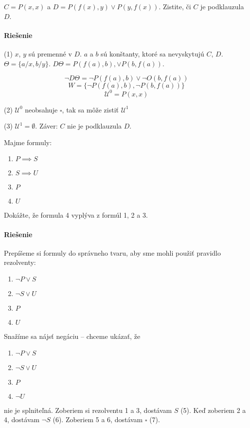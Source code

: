 \begin{priklad}
    $C=P(x,x)$ a $D=P(f(x),y) \lor P(y,f(x))$. Zistite, či $C$
    je podklauzula $D$.

    \paragraph{Riešenie} (1) $x$, $y$ sú premenné v $D$. $a$ a $b$ sú konštanty,
    ktoré sa nevyskytujú $C$, $D$. $\Theta = \{ a/x, b/y\}$. $D\Theta = P(f(a),b), \lor P(b,
    f(a))$.

    $$\neg D\Theta = \neg P(f(a),b) \lor \neg O(b,f(a))$$
    $$W = \{ \neg P(f(a),b), \neg P(b,f(a))\}$$
    $$\mathcal{U}^0 = P(x,x)$$


    \par (2) $\mathcal{U}^0$ neobsahuje $\square$, tak sa môže zistiť
    $\mathcal{U}^1$
    \par (3) $\mathcal{U}^1 = \emptyset$. Záver: $C$ nie je podklauzula $D$.
\end{priklad}

\begin{priklad}
    Majme formuly:

    \begin{enumerate}
        \item $P\implies S$
        \item $S \implies U$
        \item $P$
        \item $U$
    \end{enumerate}

    Dokážte, že formula 4 vyplýva z formúl 1, 2 a 3. 

    \paragraph{Riešenie} Prepíšeme si formuly do správneho tvaru, aby sme mohli
    použiť pravidlo rezolventy:
    \begin{enumerate}
            \item $\neg P \lor S$
            \item $\neg S\lor U$
            \item $P$
            \item $U$
    \end{enumerate}
    Snažíme sa nájsť negáciu -- chceme ukázať, že 
    \begin{enumerate}
            \item $\neg P \lor S$
            \item $\neg S\lor U$
            \item $P$
            \item $\neg U$
    \end{enumerate}

    nie je splniteľná. Zoberiem si rezolventu 1 a 3, dostávam $S$ (5). Keď zoberiem 
    2 a 4, dostávam $\neg S$ (6). Zoberiem 5 a 6, dostávam $\square$ (7).
\end{priklad}


